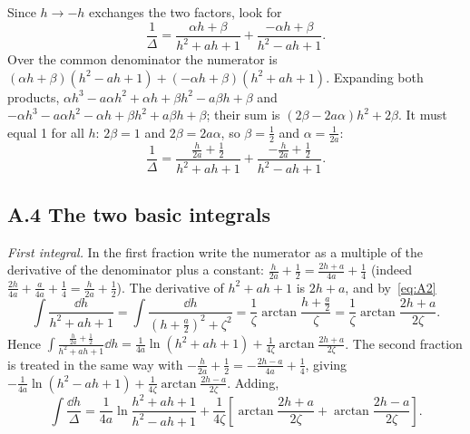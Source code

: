 Since $h\to-h$ exchanges the two factors, look for
\begin{equation}
  \frac{1}{\Delta} = \frac{\alpha h+\beta}{h^2+ah+1} + \frac{-\alpha h+\beta}{h^2-ah+1}.
\end{equation}
Over the common denominator the numerator is
$(\alpha h+\beta)(h^2-ah+1) + (-\alpha h+\beta)(h^2+ah+1)$. Expanding both products,
$\alpha h^3 - a\alpha h^2 + \alpha h + \beta h^2 - a\beta h + \beta$ and
$-\alpha h^3 - a\alpha h^2 - \alpha h + \beta h^2 + a\beta h + \beta$; their sum is
$(2\beta - 2a\alpha)h^2 + 2\beta$. It must equal 1 for all $h$: $2\beta = 1$ and $2\beta = 2a\alpha$,
so $\beta = \tfrac12$ and $\alpha = \tfrac{1}{2a}$:
\begin{equation}
  \frac{1}{\Delta} = \frac{\frac{h}{2a}+\frac12}{h^2+ah+1} + \frac{-\frac{h}{2a}+\frac12}{h^2-ah+1}.
\end{equation}

\subsection*{A.4 The two basic integrals}

\emph{First integral.} In the first fraction write the numerator as a multiple of the derivative of
the denominator plus a constant: $\frac{h}{2a}+\frac12 = \frac{2h+a}{4a} + \frac14$ (indeed
$\frac{2h}{4a}+\frac{a}{4a}+\frac14 = \frac{h}{2a}+\frac12$). The derivative of $h^2+ah+1$ is $2h+a$,
and by~\eqref{eq:A2}
\begin{equation}
  \int\frac{\dd h}{h^2+ah+1} = \int\frac{\dd h}{(h+\frac a2)^2+\zeta^2} = \frac1\zeta\arctan\frac{h+\frac a2}{\zeta}
  = \frac1\zeta\arctan\frac{2h+a}{2\zeta}.
\end{equation}
Hence $\int\frac{\frac{h}{2a}+\frac12}{h^2+ah+1}\dd h = \frac{1}{4a}\ln(h^2+ah+1) +
\frac{1}{4\zeta}\arctan\frac{2h+a}{2\zeta}$. The second fraction is treated in the same way with
$-\frac{h}{2a}+\frac12 = -\frac{2h-a}{4a}+\frac14$, giving $-\frac{1}{4a}\ln(h^2-ah+1) +
\frac{1}{4\zeta}\arctan\frac{2h-a}{2\zeta}$. Adding,
\begin{equation}\label{eq:A3}
  \int\frac{\dd h}{\Delta} = \frac{1}{4a}\ln\frac{h^2+ah+1}{h^2-ah+1}
  + \frac{1}{4\zeta}\left[\arctan\frac{2h+a}{2\zeta}+\arctan\frac{2h-a}{2\zeta}\right].
\end{equation}

